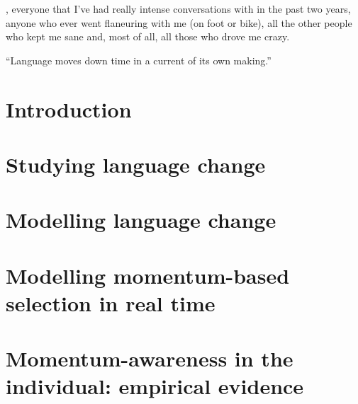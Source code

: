 \documentclass[oneside]{book}
\begin{document}
, everyone that I've had really intense conversations with in the past two years, anyone who ever went flaneuring with me (on foot or bike), all the other people who kept me sane and, most of all, all those who drove me crazy.

\tableofcontents

\listoffigures
\listoftables

\newpage
\thispagestyle{empty}
\epigraph{``Language moves down time in a current of its own making.''}{\citep[p.160]{Sapir1921}}

\mainmatter

\chapter{Introduction}
\label{ch:intro}


\chapter{Studying language change}
\label{ch:review}


\chapter{Modelling language change}
\label{ch:modelling}


\chapter[Modelling momentum-based selection]{Modelling momentum-based selection in real time}
\label{ch:momentummodel}


\chapter[Momentum-awareness in the individual]{Momentum-awareness in the individual: empirical evidence}
\label{ch:questionnaire}

\end{document}

